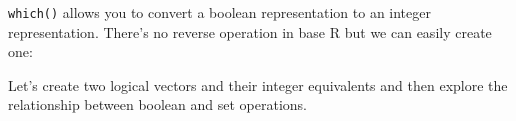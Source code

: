 \texttt{which()} allows you to convert a boolean representation to an
integer representation. There's no reverse operation in base R but we
can easily create one: 

\begin{Shaded}
\begin{Highlighting}[]
\StringTok{ }\NormalTok{(}\NormalTok{) <}\StringTok{ }

\StringTok{ }
  \StringTok{ }\NormalTok{(}
  \StringTok{ }
\NormalTok{\}}
\NormalTok{(}\NormalTok{)}
\end{Highlighting}
\end{Shaded}

Let's create two logical vectors and their integer equivalents and then
explore the relationship between boolean and set operations.

